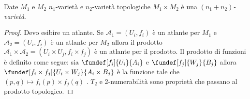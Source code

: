 
\begin{prop}
Date $M_{1}$ e $M_2$ $n_1$-varietà e $n_2$-varietà topologiche $M_1\times M_2$ è una \emph{$(n_1+n_2)$-varietà}.
\end{prop}
\begin{proof}
Devo esibire un atlante. Se $\mathcal{A}_{1} = {(U_i, f_i)}$ è un atlante per $M_1$ e $\mathcal{A}_{2} = {(U_i, f_i)}$ è un atlante per $M_2$ allora il prodotto $\mathcal{A}_{1} \times \mathcal{A}_{2} = {(U_i \times U_j, f_i \times f_j)}$ è un atlante per il prodotto. Il prodotto di funzioni è definito come segue: sia $\fundef[f_i]{U_i}{A_i}$ e $\fundef[f_j]{W_j}{B_j}$ allora $\fundef[f_i\times f_j]{U_{i} \times W_{j}}{A_{i} \times B_{j}}$ è la funzione tale che $(p, q) \mapsto f_i(p) \times f_j(q)$  .
$T_2$ e 2-numerabilità sono proprietà che passano al prodotto topologico.
\end{proof}

